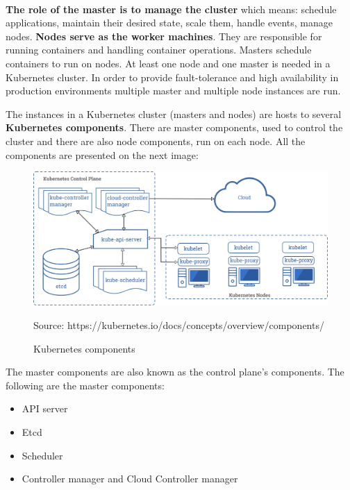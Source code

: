 \documentclass[12pt]{article}
\begin{document}
\paragraph{}
\textbf{The role of the master is to manage the cluster} which means: schedule applications, maintain their desired state, scale them, handle events, manage nodes. \textbf{Nodes serve as the worker machines}. They are responsible for running containers and handling container operations. Masters schedule containers to run on nodes\cite{book-mastering-k8s,k8s-cluster}. At least one node and one master is needed in a Kubernetes cluster. In order to provide fault-tolerance and high availability in production environments multiple master and multiple node instances are run\cite{k8s-components}.

The instances in a Kubernetes cluster (masters and nodes) are hosts to several \textbf{Kubernetes components}. There are master components, used to control the cluster and there are also node components, run on each node. All the components are presented on the next image:
\begin{figure}[H]
    \centering
    \includegraphics[width=14cm]{figures/components-of-kubernetes.png}
    \label{fig:cluster}
    \caption{Kubernetes components}
    \small{Source: https://kubernetes.io/docs/concepts/overview/components/}
\end{figure}


The master components are also known as the control plane’s components\cite{k8s-components}. The following are the master components\cite{book-mastering-k8s,k8s-components}:
\begin{itemize}
\item API server
\item Etcd
\item Scheduler
\item Controller manager and Cloud Controller manager
\end{itemize}
\end{document}
